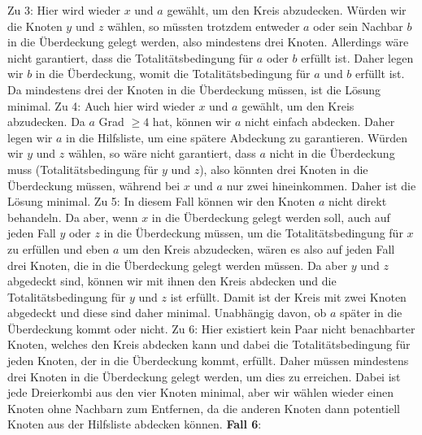\documentclass[12pt,onecolumn, notitlepage]{scrartcl}
\begin{document}
Zu 3: Hier wird wieder $x$ und $a$ gewählt, um den Kreis abzudecken. Würden wir die Knoten $y$ und $z$ wählen, so müssten trotzdem entweder $a$ oder sein Nachbar $b$ in die Überdeckung gelegt werden, also mindestens drei Knoten. Allerdings wäre nicht garantiert, dass die Totalitätsbedingung für $a$ oder $b$ erfüllt ist. Daher legen wir $b$ in die Überdeckung, womit die Totalitätsbedingung für $a$ und $b$ erfüllt ist. Da mindestens drei der Knoten in die Überdeckung müssen, ist die Lösung minimal.\newline
Zu 4: Auch hier wird wieder $x$ und $a$ gewählt, um den Kreis abzudecken. Da $a$ Grad $\geq 4$ hat, können wir $a$ nicht einfach abdecken. Daher legen wir $a$ in die Hilfsliste, um eine spätere Abdeckung zu garantieren. Würden wir $y$ und $z$ wählen, so wäre nicht garantiert, dass $a$ nicht in die Überdeckung muss (Totalitätsbedingung für $y$ und $z$), also könnten drei Knoten in die Überdeckung müssen, während bei $x$ und $a$ nur zwei hineinkommen. Daher ist die Lösung minimal.\newline
Zu 5: In diesem Fall können wir den Knoten $a$ nicht direkt behandeln. Da aber, wenn $x$ in die Überdeckung gelegt werden soll, auch auf jeden Fall $y$ oder $z$ in die Überdeckung müssen, um die Totalitätsbedingung für $x$ zu erfüllen und eben $a$ um den Kreis abzudecken, wären es also auf jeden Fall drei Knoten, die in die Überdeckung gelegt werden müssen. Da aber $y$ und $z$ abgedeckt sind, können wir mit ihnen den Kreis abdecken und die Totalitätsbedingung für $y$ und $z$ ist erfüllt. Damit ist der Kreis mit zwei Knoten abgedeckt und diese sind daher minimal. Unabhängig davon, ob $a$ später in die Überdeckung kommt oder nicht.\newline
Zu 6: Hier existiert kein Paar nicht benachbarter Knoten, welches den Kreis abdecken kann und dabei die Totalitätsbedingung für jeden Knoten, der in die Überdeckung kommt, erfüllt. Daher müssen mindestens drei Knoten in die Überdeckung gelegt werden, um dies zu erreichen. Dabei ist jede Dreierkombi aus den vier Knoten minimal, aber wir wählen wieder einen Knoten ohne Nachbarn zum Entfernen, da die anderen Knoten dann potentiell Knoten aus der Hilfsliste abdecken können. \newline\newline
\textbf{Fall 6}:\newline
\begin{center}
\end{center}
\end{document}
